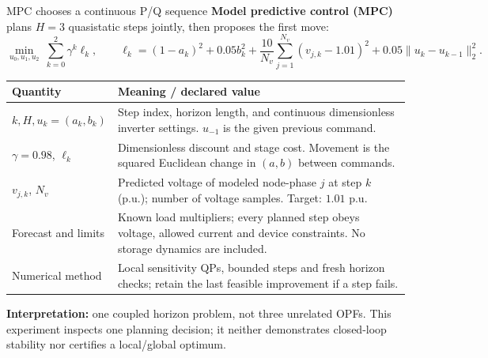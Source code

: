 \begin{frame}[t]{MPC chooses a continuous P/Q sequence}
\small
\textbf{Model predictive control (MPC)} plans $H=3$ quasistatic steps jointly, then proposes the first move:
\[
\min_{u_0,u_1,u_2}\ \sum_{k=0}^{2}\gamma^k\ell_k,\qquad
\ell_k=(1-a_k)^2+0.05b_k^2+
\frac{10}{N_v}\sum_{j=1}^{N_v}(v_{j,k}-1.01)^2+0.05\|u_k-u_{k-1}\|_2^2 .
\]
\footnotesize
\renewcommand{\arraystretch}{1.02}
\begin{tabular}{@{}>{\raggedright\arraybackslash}p{.26\linewidth}>{\raggedright\arraybackslash}p{.66\linewidth}@{}}
\toprule Quantity & Meaning / declared value \\
\midrule
$k,H,u_k=(a_k,b_k)$ & Step index, horizon length, and continuous dimensionless inverter settings. $u_{-1}$ is the given previous command. \\
$\gamma=0.98$, $\ell_k$ & Dimensionless discount and stage cost. Movement is the squared Euclidean change in $(a,b)$ between commands. \\
$v_{j,k}$, $N_v$ & Predicted voltage of modeled node-phase $j$ at step $k$ (p.u.); number of voltage samples. Target: $1.01$ p.u. \\
Forecast and limits & Known load multipliers; every planned step obeys voltage, allowed current and device constraints. No storage dynamics are included. \\
Numerical method & Local sensitivity QPs, bounded steps and fresh horizon checks; retain the last feasible improvement if a step fails. \\
\bottomrule
\end{tabular}
\par\textbf{Interpretation:} one coupled horizon problem, not three unrelated OPFs. This experiment inspects one planning decision; it neither demonstrates closed-loop stability nor certifies a local/global optimum.
\end{frame}

